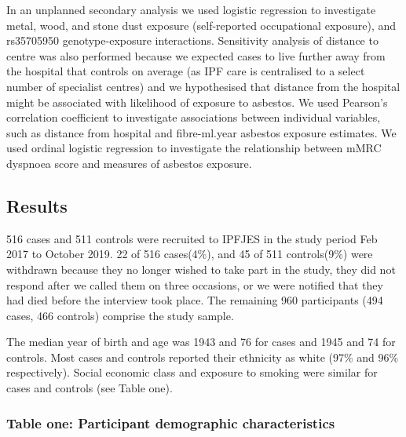 \documentclass[
]{article}
\begin{document}
In an unplanned secondary analysis we used logistic regression to
investigate metal, wood, and stone dust exposure (self-reported
occupational exposure), and rs35705950 genotype-exposure interactions.
Sensitivity analysis of distance to centre was also performed because we
expected cases to live further away from the hospital that controls on
average (as IPF care is centralised to a select number of specialist
centres) and we hypothesised that distance from the hospital might be
associated with likelihood of exposure to asbestos. We used Pearson's
correlation coefficient to investigate associations between individual
variables, such as distance from hospital and fibre-ml.year asbestos
exposure estimates. We used ordinal logistic regression to investigate
the relationship between mMRC dyspnoea score and measures of asbestos
exposure.

\hypertarget{results-3}{%
\subsection{Results}\label{results-3}}

516 cases and 511 controls were recruited to IPFJES in the study period
Feb 2017 to October 2019. 22 of 516 cases(4\%), and 45 of 511
controls(9\%) were withdrawn because they no longer wished to take part
in the study, they did not respond after we called them on three
occasions, or we were notified that they had died before the interview
took place. The remaining 960 participants (494 cases, 466 controls)
comprise the study sample.

The median year of birth and age was 1943 and 76 for cases and 1945 and
74 for controls. Most cases and controls reported their ethnicity as
white (97\% and 96\% respectively). Social economic class and exposure
to smoking were similar for cases and controls (see Table one).

\newpage

\hypertarget{table-one-participant-demographic-characteristics}{%
\subsubsection{Table one: Participant demographic
characteristics}\label{table-one-participant-demographic-characteristics}}
\end{document}
